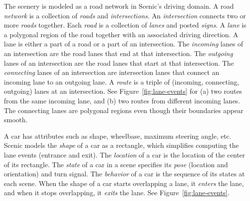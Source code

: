 The scenery is modeled as a road network in Scenic's driving domain.
%
A road \emph{network} is a collection of \emph{roads} and \emph{intersections}.
%
An \emph{intersection} connects two or more \emph{roads} together.
%
Each \emph{road} is a collection of \emph{lanes} and posted \emph{signs}.
%
A \emph{lane} is a polygonal region of the road together with an associated driving direction.
%
A lane is either a part of a road or a part of an intersection.
%
The \emph{incoming} lanes of an intersection are the road lanes that end at that intersection.
%
The \emph{outgoing} lanes of an intersection are the road lanes that start at that intersection.
%
The \emph{connecting} lanes of an intersection are intersection lanes that connect an incoming lane to an outgoing lane.
%
A \emph{route} is a triple of (incoming, connecting, outgoing) lanes at an intersection.
%
See Figure~\ref{fig:lane-events} for (a) two routes from the same incoming lane, and (b) two routes from different incoming lanes.
%
The connecting lanes are polygonal regions even though their boundaries appear smooth.


A car has attributes such as shape, wheelbase, maximum steering angle, etc.
%
Scenic models the \emph{shape} of a car as a rectangle, which simplifies computing the lane events (entrance and exit).
%
The \emph{location} of a car is the location of the center of its rectangle.
%
The \emph{state} of a car in a scene specifies its \emph{pose} (location and orientation) and turn signal.
%
The \emph{behavior} of a car is the sequence of its states at each scene.
%
When the shape of a car starts overlapping a lane, it \emph{enters} the lane, and when it stops overlapping, it \emph{exits} the lane.
%
See Figure~\ref{fig:lane-events}.


